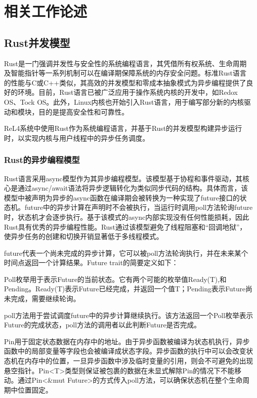 \chapter{相关工作论述}

\section{Rust并发模型}

Rust是一门强调并发性与安全性的系统编程语言，其凭借所有权系统、生命周期及智能指针等一系列机制可以在编译期保障系统的内存安全问题。标准Rust语言的性能与C或C++类似，其高效的并发模型和零成本抽象模式为异步编程提供了良好的环境。目前，Rust语言已被广泛应用于操作系统内核的开发中，如Redox OS\cite{redoxdocs}、Tock OS\cite{Tockos}。此外，Linux内核也开始引入Rust语言，用于编写部分新的内核驱动和模块，目的是提高安全性和可靠性\cite{linux-kernel-rust-docs}。

ReL4系统中使用Rust作为系统编程语言，并基于Rust的并发模型构建异步运行时，以实现内核与用户线程中的异步任务调度。

\subsection{Rust的异步编程模型}

Rust语言采用async模型作为其异步编程模型。该模型基于协程和事件驱动，其核心是通过async/await语法将异步逻辑转化为类似同步代码的结构。具体而言，该模型中被声明为异步的async函数在编译期会被转换为一种实现了future接口的状态机。future中的异步计算在声明时不会被执行，当运行时调用poll方法轮询future时，状态机才会逐步执行。基于该模式的async内部实现没有任何性能损耗，因此Rust具有优秀的异步编程性能。Rust通过该模型避免了线程阻塞和“回调地狱”，使异步任务的创建和切换开销显著低于多线程模式。

future代表一个尚未完成的异步计算，它可以被poll方法轮询执行，并在未来某个时间点返回一个计算结果。Future trait的简要定义如下：

Poll枚举用于表示Future的当前状态。它有两个可能的枚举值Ready(T),和Pending。Ready(T)表示Future已经完成，并返回一个值T；Pending表示Future尚未完成，需要继续轮询。

poll方法用于尝试调度future中的异步计算继续执行。该方法返回一个Poll枚举表示Future的完成状态，poll方法的调用者以此判断Future是否完成。

Pin用于固定状态数据在内存中的地址。由于异步函数被编译为状态机执行，异步函数中的局部变量等字段也会被编译成状态字段。异步函数的执行中可以会改变状态机在内存中的位置，一旦异步函数中涉及临时变量的引用，则会不可避免的出现悬空指针。Pin<T>类型则保证被包裹的数据在未显式解除Pin的情况下不能移动。通过Pin<\&mut Future>的方式传入poll方法，可以确保状态机在整个生命周期中位置固定。

